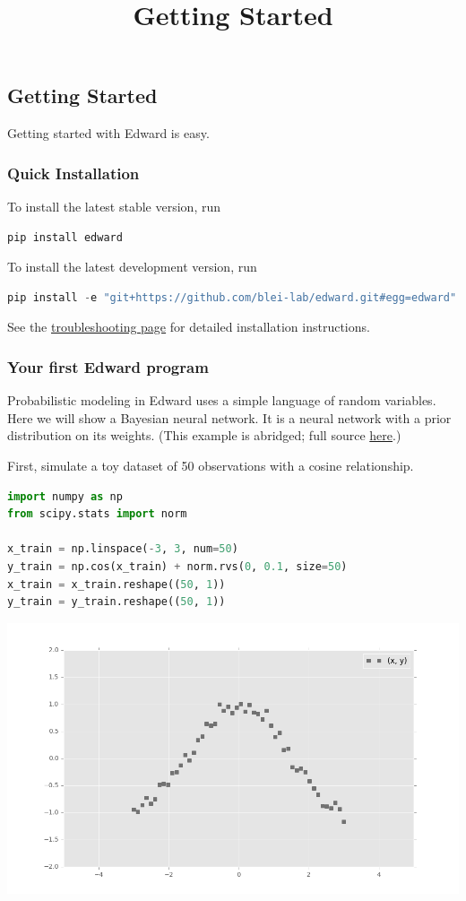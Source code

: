 \title{Getting Started}

\subsection{Getting Started}
Getting started with Edward is easy.

\subsubsection{Quick Installation}
To install the latest stable version, run

\begin{lstlisting}[language=Java]
pip install edward
\end{lstlisting}

To install the latest development version, run

\begin{lstlisting}[language=Java]
pip install -e "git+https://github.com/blei-lab/edward.git#egg=edward"
\end{lstlisting}

See the \href{/troubleshooting}{troubleshooting page} for detailed
installation instructions.


\subsubsection{Your first Edward program}

Probabilistic modeling in Edward uses a simple language of
random variables.
Here we will show a Bayesian neural network. It is a neural network
with a prior distribution on its weights.
(This example is abridged; full source
\href{https://github.com/blei-lab/edward/blob/master/examples/getting_started_example.py}
{here}.)

First, simulate a toy dataset of 50 observations with a cosine relationship.

\begin{lstlisting}[language=Python]
import numpy as np
from scipy.stats import norm

x_train = np.linspace(-3, 3, num=50)
y_train = np.cos(x_train) + norm.rvs(0, 0.1, size=50)
x_train = x_train.reshape((50, 1))
y_train = y_train.reshape((50, 1))
\end{lstlisting}

\includegraphics[width=700px]{images/getting-started-fig0.png}

